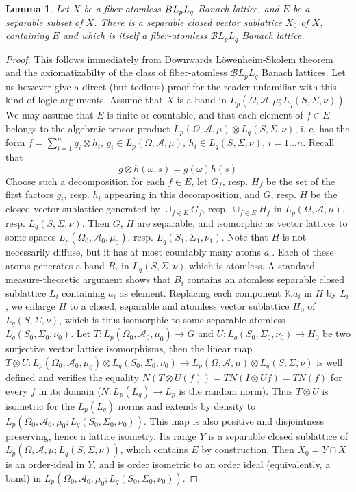 \documentclass[11pt]{amsart}
\theoremstyle{plain}
\newtheorem{lemma}[theorem]{Lemma}
\theoremstyle{remark}
\newcommand{\A}{\mathcal A}
\begin{document}
\begin{lemma}\label{sep-fib-atl}
Let $X$ be a fiber-atomless $\mathcal \mathcal BL_pL_q$ Banach lattice, and $E$ be a separable subset of $X$. There is a separable closed vector sublattice $X_0$ of $X$, containing $E$ and which is itself a fiber-atomless $\mathcal BL_pL_q$ Banach lattice.
\end{lemma}

\begin{proof}
This follows immediately from Downwards L\"owenheim-Skolem theorem \cite[prop. 9.13]{HI} and the axiomatizabilty of the class of fiber-atomless $\mathcal BL_pL_q$ Banach lattices. Let us however give a direct (but tedious) proof  for the reader unfamiliar with this kind of logic arguments. Assume that $X$ is a band in $L_p(\Omega,\A,\mu;L_q(S,\Sigma,\nu))$. We may assume that $E$ is finite or countable, and that each element of $f\in E$ belongs to the algebraic tensor product $L_p(\Omega,\A,\mu)\otimes L_q(S,\Sigma,\nu)$, i. e. has the form $f=\sum_{i=1}^n g_i\otimes h_i$, $g_i\in L_p(\Omega,\A,\mu)$, $h_i\in 
L_q(S,\Sigma,\nu)$, $i=1\dots n$. Recall that 
\[ g\otimes h(\omega,s)= g(\omega)h(s) \]
Choose such a decomposition for each $f\in E$,  let $G_f$, resp. $H_f$ be the set of the first factors $g_i$, resp. $h_i$ appearing in this decomposition, and $G$, resp. $H$ be the closed vector sublattice generated by $\cup_{f\in E}G_f$, resp. $\cup_{f\in E}H_f$ in $L_p(\Omega,\A,\mu)$, resp. $L_q(S,\Sigma,\nu)$. Then $G$, $H$ are separable,  and isomorphic as vector lattices to some spaces $L_p(\Omega_0,\A_0,\mu_0)$, resp. $L_q(S_1,\Sigma_1,\nu_1)$. Note that $H$ is not necessarily diffuse, but it has at most countably many atoms $a_i$. Each of these atoms generates a band $B_i$ in $L_q(S,\Sigma,\nu)$ which is atomless. A standard measure-theoretic argument shows that $B_i$ contains an atomless separable closed sublattice $L_i$ containing $a_i$ as element. Replacing each component $\mathbb K. a_i$ in $H$ by $L_i$, we enlarge $H$ to a closed, separable and  atomless vector sublattice $H_0$ of $L_q(S,\Sigma,\nu)$, which is thus isomorphic to some separable atomless $L_q(S_0,\Sigma_0,\nu_0)$. Let $T:L_p(\Omega_0,\A_0,\mu_0)\to G$ and $U:L_q(S_0,\Sigma_0,\nu_0)\to H_0$ be two surjective vector lattice isomorphisms, then the linear map $T\otimes U: L_p(\Omega_0,\A_0,\mu_0)\otimes L_q(S_0,\Sigma_0,\nu_0)\to L_p(\Omega,\A,\mu)\otimes L_q(S,\Sigma,\nu)$ is well defined and verifies the equality  $N(T\otimes U(f))=TN(I\otimes U f)=T N(f)$ for every $f$ in its domain ($N: L_p(L_q)\to L_p $ is the random norm). Thus $T\otimes U$ is isometric for the $L_p(L_q)$ norms and extends by density to $L_p(\Omega_0,\A_0,\mu_0;L_q(S_0,\Sigma_0,\nu_0))$. This map is also positive and disjointness preserving, hence a lattice isometry. Its range $Y$ is a separable closed sublattice of $L_p(\Omega,\A,\mu;L_q(S,\Sigma,\nu))$, which contains $E$ by construction. Then $X_0=Y\cap X$ is an order-ideal in $Y$, and is order isometric to an order ideal (equivalently, a band) in $L_p(\Omega_0,\A_0,\mu_0;L_q(S_0,\Sigma_0,\nu_0))$.
\end{proof}
\end{document}
